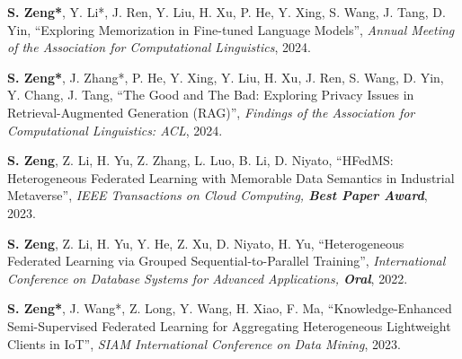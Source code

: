 \documentclass[11pt,a4paper,roman]{moderncv}        %
\newenvironment{publist}{%
  \begin{list}{}{%
    \setlength{\leftmargin}{34mm}%
    \setlength{\labelwidth}{32mm}%
    \setlength{\labelsep}{2mm}%
    \setlength{\itemsep}{1.4mm}%
    \setlength{\parsep}{0pt}%
    \setlength{\topsep}{1.5mm}%
    \renewcommand{\makelabel}[1]{\bfseries ##1\hfill}%
  }}{\end{list}}
\begin{document}
\begin{publist}
\item[{[ACL'24]}] \textbf{S. Zeng*}, Y. Li*, J. Ren, Y. Liu, H. Xu, P. He, Y. Xing, S. Wang, J. Tang, D. Yin, ``Exploring Memorization in Fine-tuned Language Models'', \textit{Annual Meeting of the Association for Computational Linguistics}, 2024.
\item[{[ACL'24]}] \textbf{S. Zeng*}, J. Zhang*, P. He, Y. Xing, Y. Liu, H. Xu, J. Ren, S. Wang, D. Yin, Y. Chang, J. Tang, ``The Good and The Bad: Exploring Privacy Issues in Retrieval-Augmented Generation (RAG)'', \textit{Findings of the Association for Computational Linguistics: ACL}, 2024.
\item[{[IEEE TCC, Best Paper]}] \textbf{S. Zeng}, Z. Li, H. Yu, Z. Zhang, L. Luo, B. Li, D. Niyato, ``HFedMS: Heterogeneous Federated Learning with Memorable Data Semantics in Industrial Metaverse'', \textit{IEEE Transactions on Cloud Computing, \textbf{\color{honor}Best Paper Award}}, 2023.
\item[{[DASFAA'22, Oral]}] \textbf{S. Zeng}, Z. Li, H. Yu, Y. He, Z. Xu, D. Niyato, H. Yu, ``Heterogeneous Federated Learning via Grouped Sequential-to-Parallel Training'', \textit{International Conference on Database Systems for Advanced Applications, \textbf{\color{honor}Oral}}, 2022.
\item[{[SDM'23]}] \textbf{S. Zeng*}, J. Wang*, Z. Long, Y. Wang, H. Xiao, F. Ma, ``Knowledge-Enhanced Semi-Supervised Federated Learning for Aggregating Heterogeneous Lightweight Clients in IoT'', \textit{SIAM International Conference on Data Mining}, 2023.
\end{publist}
\end{document}
